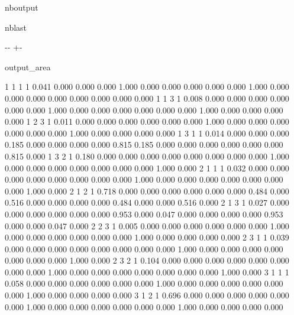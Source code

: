 \documentclass[letterpaper,10pt,english]{sphinxmanual}
\begin{document}
\begin{sphinxuseclass}{nboutput}
\begin{sphinxuseclass}{nblast}
{

\kern-\sphinxverbatimsmallskipamount\kern-\baselineskip
\kern+\FrameHeightAdjust\kern-\fboxrule
\vspace{\nbsphinxcodecellspacing}

\begin{sphinxuseclass}{output_area}
\begin{sphinxuseclass}{}


\begin{sphinxVerbatim}[commandchars=\\\{\}]
  1  1  1  1      0.041  0.000  0.000  0.000  1.000  0.000  0.000  0.000  0.000  0.000  1.000  0.000  0.000  0.000  0.000  0.000  0.000  0.000  0.000
  1  1  3  1      0.008  0.000  0.000  0.000  0.000  0.000  0.000  1.000  0.000  0.000  0.000  0.000  0.000  0.000  1.000  0.000  0.000  0.000  0.000
  1  2  3  1      0.011  0.000  0.000  0.000  0.000  0.000  0.000  1.000  0.000  0.000  0.000  0.000  0.000  0.000  1.000  0.000  0.000  0.000  0.000
  1  3  1  1      0.014  0.000  0.000  0.000  0.185  0.000  0.000  0.000  0.000  0.815  0.185  0.000  0.000  0.000  0.000  0.000  0.000  0.815  0.000
  1  3  2  1      0.180  0.000  0.000  0.000  0.000  0.000  0.000  0.000  0.000  1.000  0.000  0.000  0.000  0.000  0.000  0.000  0.000  1.000  0.000
  2  1  1  1      0.032  0.000  0.000  0.000  0.000  0.000  0.000  0.000  0.000  1.000  0.000  0.000  0.000  0.000  0.000  0.000  0.000  1.000  0.000
  2  1  2  1      0.718  0.000  0.000  0.000  0.000  0.000  0.000  0.484  0.000  0.516  0.000  0.000  0.000  0.000  0.484  0.000  0.000  0.516  0.000
  2  1  3  1      0.027  0.000  0.000  0.000  0.000  0.000  0.000  0.953  0.000  0.047  0.000  0.000  0.000  0.000  0.953  0.000  0.000  0.047  0.000
  2  2  3  1      0.005  0.000  0.000  0.000  0.000  0.000  0.000  1.000  0.000  0.000  0.000  0.000  0.000  0.000  1.000  0.000  0.000  0.000  0.000
  2  3  1  1      0.039  0.000  0.000  0.000  0.000  0.000  0.000  0.000  0.000  1.000  0.000  0.000  0.000  0.000  0.000  0.000  0.000  1.000  0.000
  2  3  2  1      0.104  0.000  0.000  0.000  0.000  0.000  0.000  0.000  0.000  1.000  0.000  0.000  0.000  0.000  0.000  0.000  0.000  1.000  0.000
  3  1  1  1      0.058  0.000  0.000  0.000  0.000  0.000  0.000  1.000  0.000  0.000  0.000  0.000  0.000  0.000  1.000  0.000  0.000  0.000  0.000
  3  1  2  1      0.696  0.000  0.000  0.000  0.000  0.000  0.000  1.000  0.000  0.000  0.000  0.000  0.000  0.000  1.000  0.000  0.000  0.000  0.000

\end{sphinxVerbatim}
\end{sphinxuseclass}
\end{sphinxuseclass}}
\end{sphinxuseclass}
\end{sphinxuseclass}
\end{document}
